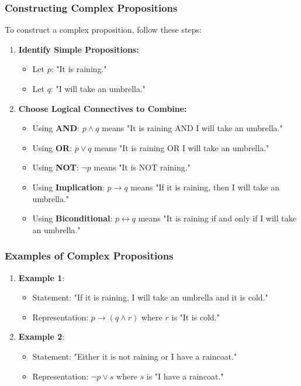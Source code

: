 \documentclass[aspectratio=169]{beamer}
\begin{document}
\begin{frame}[fragile]
    \frametitle{Constructing Complex Propositions}
    To construct a complex proposition, follow these steps:
    
    \begin{enumerate}
        \item \textbf{Identify Simple Propositions:}
        \begin{itemize}
            \item Let \( p \): "It is raining."
            \item Let \( q \): "I will take an umbrella."
        \end{itemize}
        
        \item \textbf{Choose Logical Connectives to Combine:}
        \begin{itemize}
            \item Using \textbf{AND}: \( p \land q \) means "It is raining AND I will take an umbrella."
            \item Using \textbf{OR}: \( p \lor q \) means "It is raining OR I will take an umbrella."
            \item Using \textbf{NOT}: \( \neg p \) means "It is NOT raining."
            \item Using \textbf{Implication}: \( p \to q \) means "If it is raining, then I will take an umbrella."
            \item Using \textbf{Biconditional}: \( p \leftrightarrow q \) means "It is raining if and only if I will take an umbrella."
        \end{itemize}
    \end{enumerate}
\end{frame}

\begin{frame}[fragile]
    \frametitle{Examples of Complex Propositions}
    \begin{enumerate}
        \item \textbf{Example 1}:
        \begin{itemize}
            \item Statement: "If it is raining, I will take an umbrella and it is cold."
            \item Representation: \( p \to (q \land r) \) where \( r \) is "It is cold."
        \end{itemize}

        \item \textbf{Example 2}:
        \begin{itemize}
            \item Statement: "Either it is not raining or I have a raincoat."
            \item Representation: \( \neg p \lor s \) where \( s \) is "I have a raincoat."
        \end{itemize}
    \end{enumerate}
\end{frame}
\end{document}
